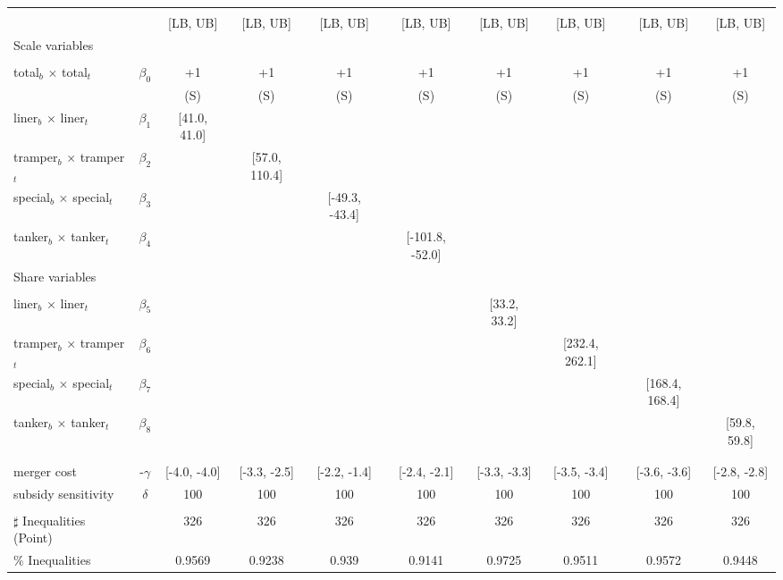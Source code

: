 \begin{tabular}{@{\extracolsep{5pt}}lccccccccc}
\toprule 
 &  &  &  &  &  &  &  &  &  \\
 &  & [LB, UB] & [LB, UB] & [LB, UB] & [LB, UB] & [LB, UB] & [LB, UB] & [LB, UB] & [LB, UB] \\
\midrule 
Scale variables &  &  &  &  &  &  &  \\
 &  &  &  &  &  &  &  &  \\
total$_{b}$ $\times$ total$_{t}$ & $\beta_0$ & +1 & +1 & +1 & +1 & +1 & +1 & +1 & +1 \\
 &  & (S) & (S) & (S) & (S) & (S) & (S) & (S) & (S) \\
liner$_{b}$ $\times$ liner$_{t}$ & $\beta_1$ & [41.0, 41.0] &  &  &  &  &  &  &  \\
tramper$_{b}$ $\times$ tramper$_{t}$ & $\beta_2$ &  & [57.0, 110.4] &  &  &  &  &  &  \\
special$_{b}$ $\times$ special$_{t}$ & $\beta_3$ &  &  & [-49.3, -43.4] &  &  &  &  &  \\
tanker$_{b}$ $\times$ tanker$_{t}$ & $\beta_4$ &  &  &  & [-101.8, -52.0] &  &  &  &  \\
Share variables &  &  &  &  &  &  &  &  &  \\
 &  &  &  &  &  &  &  &  &  \\
liner$_{b}$ $\times$ liner$_{t}$ & $\beta_5$ &  &  &  &  & [33.2, 33.2] &  &  &  \\
tramper$_{b}$ $\times$ tramper$_{t}$ & $\beta_6$ &  &  &  &  &  & [232.4, 262.1] &  &  \\
special$_{b}$ $\times$ special$_{t}$ & $\beta_7$ &  &  &  &  &  &  & [168.4, 168.4] &  \\
tanker$_{b}$ $\times$ tanker$_{t}$ & $\beta_8$ &  &  &  &  &  &  &  & [59.8, 59.8] \\
 &  &  &  &  &  &  &  &  &  \\
 &  &  &  &  &  &  &  &  &  \\
merger cost & -$\gamma$ & [-4.0, -4.0] & [-3.3, -2.5] & [-2.2, -1.4] & [-2.4, -2.1] & [-3.3, -3.3] & [-3.5, -3.4] & [-3.6, -3.6] & [-2.8, -2.8] \\
subsidy sensitivity & $\delta$ & 100 & 100 & 100 & 100 & 100 & 100 & 100 & 100 \\
 &  &  &  &  &  &  &  &  &  \\
\hline 
$\sharp$ Inequalities (Point) &  & 326 & 326 & 326 & 326 & 326 & 326 & 326 & 326 \\
\% Inequalities &  & 0.9569 & 0.9238 & 0.939 & 0.9141 & 0.9725 & 0.9511 & 0.9572 & 0.9448 \\
\bottomrule 
\end{tabular}
